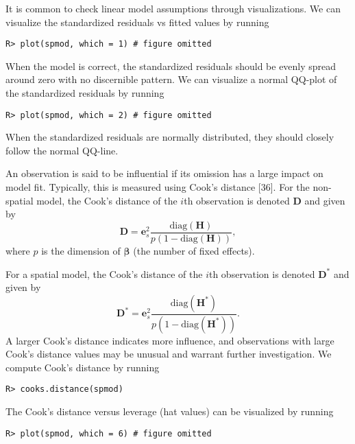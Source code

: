 \documentclass[10pt,letterpaper]{article}
\begin{document}
It is common to check linear model assumptions through visualizations.
We can visualize the standardized residuals vs fitted values by running

\begin{verbatim}
R> plot(spmod, which = 1) # figure omitted
\end{verbatim}

\noindent When the model is correct, the standardized residuals should
be evenly spread around zero with no discernible pattern. We can
visualize a normal QQ-plot of the standardized residuals by running

\begin{verbatim}
R> plot(spmod, which = 2) # figure omitted
\end{verbatim}

\noindent When the standardized residuals are normally distributed, they
should closely follow the normal QQ-line.

An observation is said to be influential if its omission has a large
impact on model fit. Typically, this is measured using Cook's distance
{[}36{]}. For the non-spatial model, the Cook's distance of the \(i\)th
observation is denoted \(\mathbf{D}\) and given by \begin{equation*}
  \mathbf{D} = \mathbf{e}_{s}^2 \frac{\text{diag}(\mathbf{H})}{p(1 - \text{diag}(\mathbf{H}))},
\end{equation*} where \(p\) is the dimension of \(\boldsymbol{\beta}\)
(the number of fixed effects).

For a spatial model, the Cook's distance of the \(i\)th observation is
denoted \(\mathbf{D}^*\) and given by \begin{equation*}
  \mathbf{D}^* = \mathbf{e}_{s}^2 \frac{\text{diag}(\mathbf{H}^*)}{p(1 - \text{diag}(\mathbf{H}^*))} .
\end{equation*} A larger Cook's distance indicates more influence, and
observations with large Cook's distance values may be unusual and
warrant further investigation. We compute Cook's distance by running

\begin{verbatim}
R> cooks.distance(spmod)
\end{verbatim}

\noindent The Cook's distance versus leverage (hat values) can be
visualized by running

\begin{verbatim}
R> plot(spmod, which = 6) # figure omitted
\end{verbatim}
\end{document}
